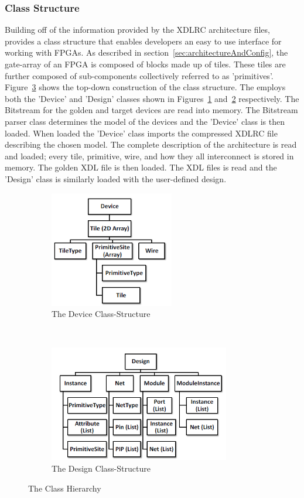 \subsubsection{Class Structure} \label{sec:classStructure}
Building off of the information provided by the XDLRC architecture files, \RapidSmith provides a class structure that enables developers an easy to use interface for working with \acrshort{FPGA}s.
As described in section~\ref{sec:architectureAndConfig}, the gate-array of an \acrshort{FPGA} is composed of blocks made up of tiles.
These tiles are further composed of sub-components collectively referred to as 'primitives'.
Figure~\ref{fig:classStructures} shows the top-down construction of the \RapidSmith class structure.
The \Name employs both the 'Device' and 'Design' classes shown in Figures~\ref{fig:rapidSmithDevice} and~\ref{fig:rapidSmithDesign} respectively.
The \gls{Bitstream} for the \gls{golden} and \gls{target} devices are read into memory. 
The \gls{Bitstream} parser class determines the model of the devices and the 'Device' class is then loaded.
When loaded the 'Device' class imports the compressed XDLRC file describing the chosen model.
The complete description of the architecture is read and loaded; every tile, primitive, wire, and how they all interconnect is stored in memory.
The \gls{golden} \acrshort{XDL} file is then loaded.
The \acrshort{XDL} files is read and the 'Design' class is similarly loaded with the user-defined design.
\begin{figure}[h]
	\centering
	\begin{subfigure}[t]{0.5\textwidth}
			\centering
			\includegraphics[height=2in]{Figures/rapidSmithDevice}
			\caption{The Device Class-Structure}
			\label{fig:rapidSmithDevice}
	\end{subfigure}%
	~ 
	\begin{subfigure}[t]{0.5\textwidth}
		\centering
		\includegraphics[height=2in]{Figures/rapidSmithDesign}
		\caption{The Design Class-Structure}
		 \label{fig:rapidSmithDesign}
	\end{subfigure}
	\caption{The \RapidSmith Class Hierarchy~\cite{rapidSmithManual}}
	 \label{fig:classStructures}
\end{figure}
